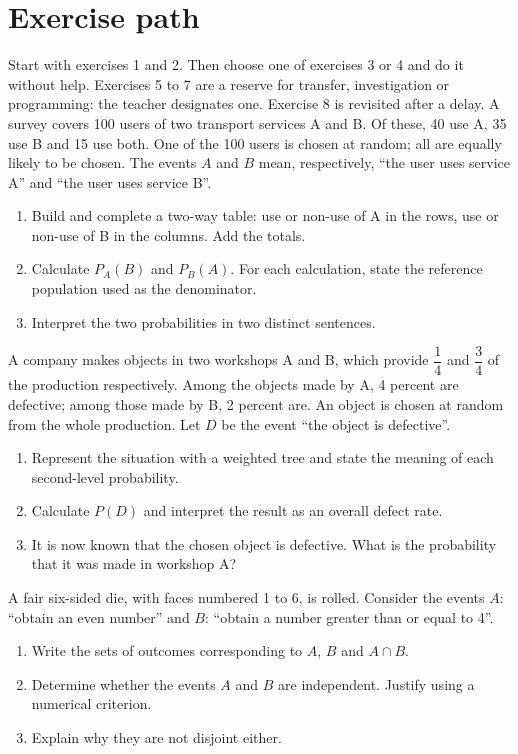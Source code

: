 \section*{Exercise path}\label{C05-PARC}
Start with exercises 1 and 2. Then choose one of exercises 3 or 4 and do it without help. Exercises 5 to 7 are a reserve for transfer, investigation or programming: the teacher designates one. Exercise 8 is revisited after a delay.
\begingroup
{}
A survey covers 100 users of two transport services A and B. Of these, 40 use A, 35 use B and 15 use both. One of the 100 users is chosen at random; all are equally likely to be chosen. The events $A$ and $B$ mean, respectively, ``the user uses service A'' and ``the user uses service B''.
\begin{enumerate}[label=\arabic*.]
\item Build and complete a two-way table: use or non-use of A in the rows, use or non-use of B in the columns. Add the totals.
\item Calculate $P_A(B)$ and $P_B(A)$. For each calculation, state the reference population used as the denominator.
\item Interpret the two probabilities in two distinct sentences.
\end{enumerate}
A company makes objects in two workshops A and B, which provide $\dfrac14$ and $\dfrac34$ of the production respectively. Among the objects made by A, 4 percent are defective; among those made by B, 2 percent are. An object is chosen at random from the whole production. Let $D$ be the event ``the object is defective''.
\begin{enumerate}[label=\arabic*.]
\item Represent the situation with a weighted tree and state the meaning of each second-level probability.
\item Calculate $P(D)$ and interpret the result as an overall defect rate.
\item It is now known that the chosen object is defective. What is the probability that it was made in workshop A?
\end{enumerate}
A fair six-sided die, with faces numbered 1 to 6, is rolled. Consider the events $A$: ``obtain an even number'' and $B$: ``obtain a number greater than or equal to 4''.
\begin{enumerate}[label=\arabic*.]
\item Write the sets of outcomes corresponding to $A$, $B$ and $A\cap B$.
\item Determine whether the events $A$ and $B$ are independent. Justify using a numerical criterion.
\item Explain why they are not disjoint either.
\end{enumerate}

